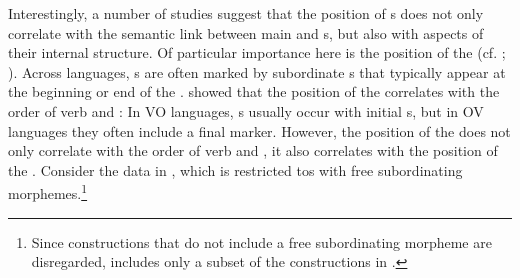 \documentclass[output=paper]{langsci/langscibook}
\begin{document}
Interestingly, a number of studies suggest that the position of s does not only correlate with the semantic link between main and s, but also with aspects of their internal structure. Of particular importance here is the position of the  (cf. \citealt{Diessel2001}; \citealt{Schmidtke-Bode2009,Hetterle2015}). Across languages, s are often marked by subordinate s that typically appear at the beginning or end of the . \citet{Dryer1992} showed that the position of the  correlates with the order of verb and : In VO languages, s usually occur with initial s, but in OV languages they often include a final marker. However, the position of the  does not only correlate with the order of verb and , it also correlates with the position of the . Consider the data in , which is restricted tos with free subordinating morphemes.\footnote{Since  constructions that do not include a free subordinating morpheme are disregarded,  includes only a subset of the  constructions in .} 
\end{document}

